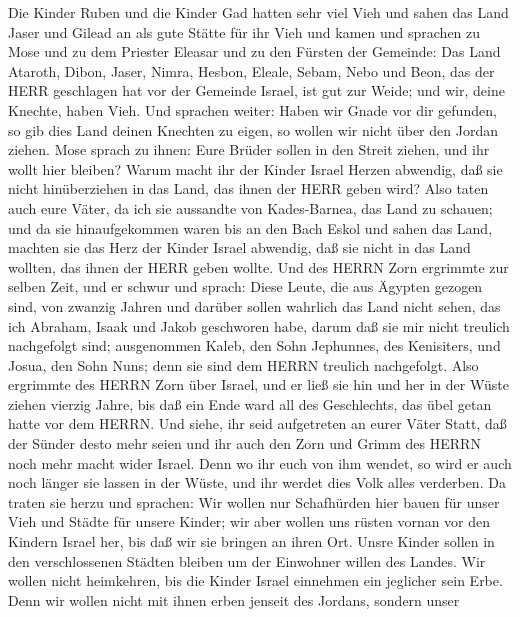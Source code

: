  Die Kinder Ruben und die Kinder Gad hatten sehr viel Vieh
und sahen das Land Jaser und Gilead an als gute Stätte für ihr Vieh
 und kamen und sprachen zu Mose und zu dem Priester Eleasar
und zu den Fürsten der Gemeinde:  Das Land Ataroth, Dibon,
Jaser, Nimra, Hesbon, Eleale, Sebam, Nebo und Beon,  das der
HERR geschlagen hat vor der Gemeinde Israel, ist gut zur Weide; und wir,
deine Knechte, haben Vieh.  Und sprachen weiter: Haben wir
Gnade vor dir gefunden, so gib dies Land deinen Knechten zu eigen, so
wollen wir nicht über den Jordan ziehen.  Mose sprach zu
ihnen: Eure Brüder sollen in den Streit ziehen, und ihr wollt hier
bleiben?  Warum macht ihr der Kinder Israel Herzen abwendig,
daß sie nicht hinüberziehen in das Land, das ihnen der HERR geben wird?
 Also taten auch eure Väter, da ich sie aussandte von
Kades-Barnea, das Land zu schauen;  und da sie
hinaufgekommen waren bis an den Bach Eskol und sahen das Land, machten
sie das Herz der Kinder Israel abwendig, daß sie nicht in das Land
wollten, das ihnen der HERR geben wollte.  Und des HERRN
Zorn ergrimmte zur selben Zeit, und er schwur und sprach: 
Diese Leute, die aus Ägypten gezogen sind, von zwanzig Jahren und
darüber sollen wahrlich das Land nicht sehen, das ich Abraham, Isaak und
Jakob geschworen habe, darum daß sie mir nicht treulich nachgefolgt
sind;  ausgenommen Kaleb, den Sohn Jephunnes, des
Kenisiters, und Josua, den Sohn Nuns; denn sie sind dem HERRN treulich
nachgefolgt.  Also ergrimmte des HERRN Zorn über Israel,
und er ließ sie hin und her in der Wüste ziehen vierzig Jahre, bis daß
ein Ende ward all des Geschlechts, das übel getan hatte vor dem HERRN.
 Und siehe, ihr seid aufgetreten an eurer Väter Statt, daß
der Sünder desto mehr seien und ihr auch den Zorn und Grimm des HERRN
noch mehr macht wider Israel.  Denn wo ihr euch von ihm
wendet, so wird er auch noch länger sie lassen in der Wüste, und ihr
werdet dies Volk alles verderben.  Da traten sie herzu und
sprachen: Wir wollen nur Schafhürden hier bauen für unser Vieh und
Städte für unsere Kinder;  wir aber wollen uns rüsten
vornan vor den Kindern Israel her, bis daß wir sie bringen an ihren Ort.
Unsre Kinder sollen in den verschlossenen Städten bleiben um der
Einwohner willen des Landes.  Wir wollen nicht heimkehren,
bis die Kinder Israel einnehmen ein jeglicher sein Erbe. 
Denn wir wollen nicht mit ihnen erben jenseit des Jordans, sondern unser
